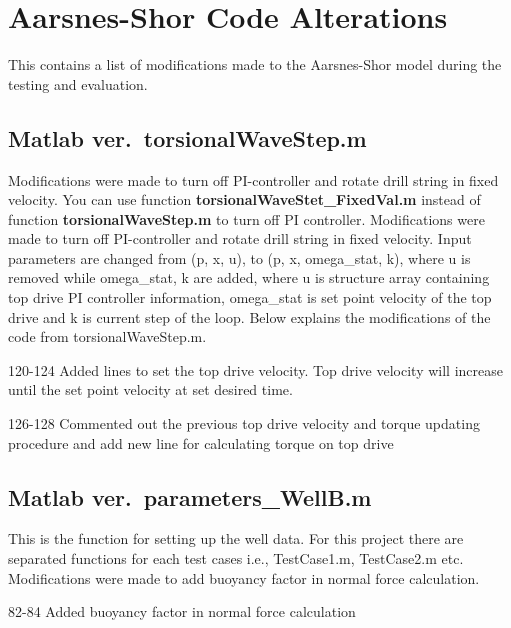 \chapter{Aarsnes-Shor Code Alterations}
This \appendixname{} contains a list of modifications made to the Aarsnes-Shor model during the testing and evaluation.

\section{Matlab ver.\ {\codefont torsionalWaveStep.m}}
Modifications were made to turn off PI-controller and rotate drill string in fixed velocity. You can use function \textbf{torsionalWaveStet\_FixedVal.m} instead of function \textbf{torsionalWaveStep.m} to turn off PI controller. Modifications were made to turn off PI-controller and rotate drill string in fixed velocity. Input parameters are changed from (p, x, u), to (p, x, omega\_stat, k), where u is removed while omega\_stat, k are added, where u is structure array containing top drive PI controller information, omega\_stat is set point velocity of the top drive and k is current step of the loop. Below explains the modifications of the code from torsionalWaveStep.m.

\begin{codemodifications}
\begin{codemodification}{120-124}
Added lines to set the top drive velocity. Top drive velocity will increase until the set point velocity at set desired time.
\end{codemodification}

\begin{codemodification}{126-128}
Commented out the previous top drive velocity and torque updating procedure and add new line for calculating torque on top drive
\end{codemodification}
\end{codemodifications}

\section{Matlab ver.\ {\codefont parameters\_WellB.m}}
This is the function for setting up the well data. For this project there are separated functions for each test cases i.e., TestCase1.m, TestCase2.m etc. Modifications were made to add buoyancy factor in normal force calculation.
\begin{codemodifications}
\begin{codemodification}{82-84}
Added buoyancy factor in normal force calculation
\end{codemodification}
\end{codemodifications} 

